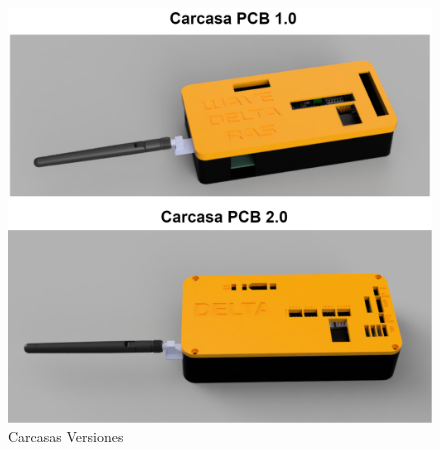 \begin{figure}[H]
    \centering
    \includegraphics[width=\textwidth]{Imagenes/Anexos/carcasa_version.png}
    \caption{Carcasas Versiones }
    \label{fig:carcasasVersion}
\end{figure}

